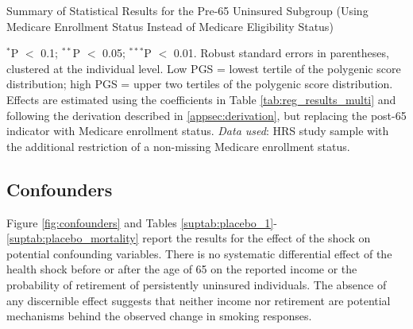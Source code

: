 \begin{table}[!ht] \centering
	\caption{Summary of Statistical Results for the Pre-65 Uninsured Subgroup (Using Medicare Enrollment Status Instead of Medicare Eligibility Status)}
	\label{suptab:main_effects_medicare}

		\begin{flushleft}
			$^{*}$P $<$ 0.1; $^{**}$P $<$ 0.05; $^{***}$P $<$ 0.01. Robust standard errors in parentheses, clustered at the individual level.
			Low PGS = lowest tertile of the polygenic score distribution; high PGS = upper two tertiles of the polygenic score distribution.
			Effects are estimated using the coefficients in Table \ref{tab:reg_results_multi} and following the derivation described in \ref{appsec:derivation}, but replacing the post-65 indicator with Medicare enrollment status.
			\textit{Data used}: HRS study sample with the additional restriction of a non-missing Medicare enrollment status.
		\end{flushleft}

\end{table}


\subsection{Confounders} \label{appsec:confounders}
Figure \ref{fig:confounders} and Tables \ref{suptab:placebo_1}-\ref{suptab:placebo_mortality} report the results for the effect of the shock on potential confounding variables.
There is no systematic differential effect of the health shock before or after the age of 65 on the reported income or the probability of retirement of persistently uninsured individuals.
The absence of any discernible effect suggests that neither income nor retirement are potential mechanisms behind the observed change in smoking responses.


